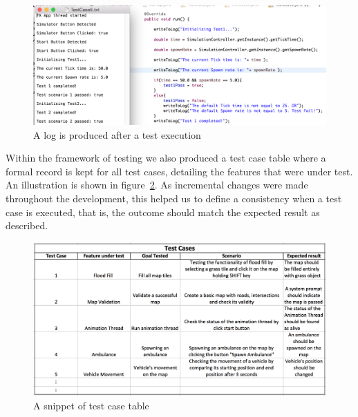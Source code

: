 \begin{figure}[h]
        \begin{center}
                \includegraphics[width=\textwidth]{img/testCase.png}
                \caption{A log is produced after a test execution}
        \label{fig:testCase}
        \end{center}
\end{figure}


Within the framework of testing we also produced a test case table where a formal record is kept for all test cases, detailing the features that were under test. An illustration is shown in figure~\ref{fig:testCaseTable}.  As incremental changes were made throughout the development, this helped us to define a consistency when a test case is executed, that is, the outcome should match the expected result as described.

\begin{figure}[h]
        \begin{center}
                \includegraphics[width=\textwidth]{img/testCaseTable.png}
                \caption{A snippet of test case table}
        \label{fig:testCaseTable}
        \end{center}
\end{figure}

